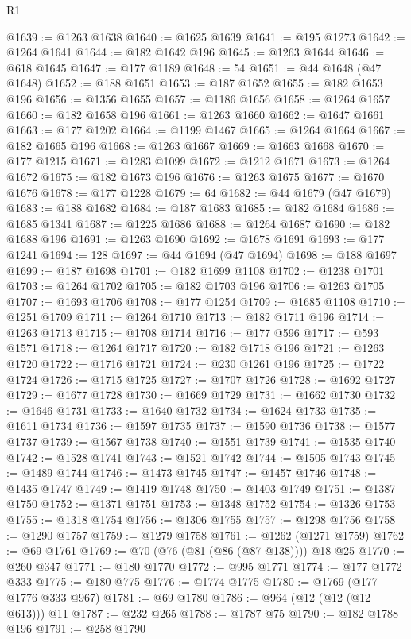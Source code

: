 \begin{lexlean}{R1}
\begin{coremodule}
@1639 := @1263 @1638
@1640 := @1625 @1639
@1641 := @195 @1273
@1642 := @1264 @1641
@1644 := @182 @1642 @196
@1645 := @1263 @1644
@1646 := @618 @1645
@1647 := @177 @1189
@1648 := 54
@1651 := @44 @1648 (@47 @1648)
@1652 := @188 @1651
@1653 := @187 @1652
@1655 := @182 @1653 @196
@1656 := @1356 @1655
@1657 := @1186 @1656
@1658 := @1264 @1657
@1660 := @182 @1658 @196
@1661 := @1263 @1660
@1662 := @1647 @1661
@1663 := @177 @1202
@1664 := @1199 @1467
@1665 := @1264 @1664
@1667 := @182 @1665 @196
@1668 := @1263 @1667
@1669 := @1663 @1668
@1670 := @177 @1215
@1671 := @1283 @1099
@1672 := @1212 @1671
@1673 := @1264 @1672
@1675 := @182 @1673 @196
@1676 := @1263 @1675
@1677 := @1670 @1676
@1678 := @177 @1228
@1679 := 64
@1682 := @44 @1679 (@47 @1679)
@1683 := @188 @1682
@1684 := @187 @1683
@1685 := @182 @1684
@1686 := @1685 @1341
@1687 := @1225 @1686
@1688 := @1264 @1687
@1690 := @182 @1688 @196
@1691 := @1263 @1690
@1692 := @1678 @1691
@1693 := @177 @1241
@1694 := 128
@1697 := @44 @1694 (@47 @1694)
@1698 := @188 @1697
@1699 := @187 @1698
@1701 := @182 @1699 @1108
@1702 := @1238 @1701
@1703 := @1264 @1702
@1705 := @182 @1703 @196
@1706 := @1263 @1705
@1707 := @1693 @1706
@1708 := @177 @1254
@1709 := @1685 @1108
@1710 := @1251 @1709
@1711 := @1264 @1710
@1713 := @182 @1711 @196
@1714 := @1263 @1713
@1715 := @1708 @1714
@1716 := @177 @596
@1717 := @593 @1571
@1718 := @1264 @1717
@1720 := @182 @1718 @196
@1721 := @1263 @1720
@1722 := @1716 @1721
@1724 := @230 @1261 @196
@1725 := @1722 @1724
@1726 := @1715 @1725
@1727 := @1707 @1726
@1728 := @1692 @1727
@1729 := @1677 @1728
@1730 := @1669 @1729
@1731 := @1662 @1730
@1732 := @1646 @1731
@1733 := @1640 @1732
@1734 := @1624 @1733
@1735 := @1611 @1734
@1736 := @1597 @1735
@1737 := @1590 @1736
@1738 := @1577 @1737
@1739 := @1567 @1738
@1740 := @1551 @1739
@1741 := @1535 @1740
@1742 := @1528 @1741
@1743 := @1521 @1742
@1744 := @1505 @1743
@1745 := @1489 @1744
@1746 := @1473 @1745
@1747 := @1457 @1746
@1748 := @1435 @1747
@1749 := @1419 @1748
@1750 := @1403 @1749
@1751 := @1387 @1750
@1752 := @1371 @1751
@1753 := @1348 @1752
@1754 := @1326 @1753
@1755 := @1318 @1754
@1756 := @1306 @1755
@1757 := @1298 @1756
@1758 := @1290 @1757
@1759 := @1279 @1758
@1761 := @1262 (@1271 @1759)
@1762 := @69 @1761
@1769 := @70 (@76 (@81 (@86 (@87 @138)))) @18 @25
@1770 := @260 @347
@1771 := @180 @1770
@1772 := @995 @1771
@1774 := @177 @1772 @333
@1775 := @180 @775
@1776 := @1774 @1775
@1780 := @1769 (@177 @1776 @333 @967)
@1781 := @69 @1780
@1786 := @964 (@12 (@12 (@12 @613))) @11
@1787 := @232 @265
@1788 := @1787 @75
@1790 := @182 @1788 @196
@1791 := @258 @1790

\end{coremodule}
\end{lexlean}
